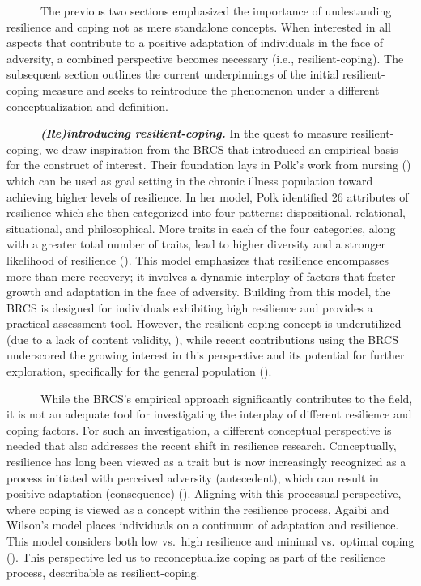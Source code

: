 \documentclass[
  man,floatsintext]{apa7}
\begin{document}
~~~~~~The previous two sections emphasized the importance of undestanding resilience and coping not as mere standalone concepts. When interested in all aspects that contribute to a positive adaptation of individuals in the face of adversity, a combined perspective becomes necessary (i.e., resilient-coping). The subsequent section outlines the current underpinnings of the initial resilient-coping measure and seeks to reintroduce the phenomenon under a different conceptualization and definition.

~~~~~~\textbf{\emph{(Re)introducing resilient-coping.}} In the quest to measure resilient-coping, we draw inspiration from the BRCS that introduced an empirical basis for the construct of interest. Their foundation lays in Polk's work from nursing () which can be used as goal setting in the chronic illness population toward achieving higher levels of resilience. In her model, Polk identified 26 attributes of resilience which she then categorized into four patterns: dispositional, relational, situational, and philosophical. More traits in each of the four categories, along with a greater total number of traits, lead to higher diversity and a stronger likelihood of resilience (). This model emphasizes that resilience encompasses more than mere recovery; it involves a dynamic interplay of factors that foster growth and adaptation in the face of adversity. Building from this model, the BRCS is designed for individuals exhibiting high resilience and provides a practical assessment tool. However, the resilient-coping concept is underutilized (due to a lack of content validity, ), while recent contributions using the BRCS underscored the growing interest in this perspective and its potential for further exploration, specifically for the general population ().

~~~~~~While the BRCS's empirical approach significantly contributes to the field, it is not an adequate tool for investigating the interplay of different resilience and coping factors. For such an investigation, a different conceptual perspective is needed that also addresses the recent shift in resilience research. Conceptually, resilience has long been viewed as a trait but is now increasingly recognized as a process initiated with perceived adversity (antecedent), which can result in positive adaptation (consequence) (). Aligning with this processual perspective, where coping is viewed as a concept within the resilience process, Agaibi and Wilson's model places individuals on a continuum of adaptation and resilience. This model considers both low vs.~high resilience and minimal vs.~optimal coping (). This perspective led us to reconceptualize coping as part of the resilience process, describable as resilient-coping.
\end{document}
